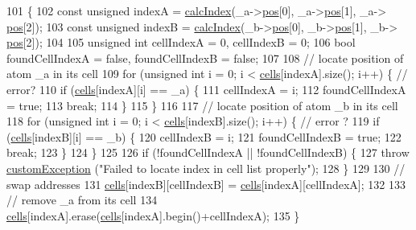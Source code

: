 \begin{DoxyCode}
101                                                         \{
102     \textcolor{keyword}{const} \textcolor{keywordtype}{unsigned} indexA = \hyperlink{classcell_list_aa6b843131cd487164a137571c7343cab}{calcIndex}(\_a->\hyperlink{classatom_a3ae5f4880e7831d8b2c9fda72b4eb24a}{pos}[0], \_a->\hyperlink{classatom_a3ae5f4880e7831d8b2c9fda72b4eb24a}{pos}[1], \_a->
      \hyperlink{classatom_a3ae5f4880e7831d8b2c9fda72b4eb24a}{pos}[2]);
103     \textcolor{keyword}{const} \textcolor{keywordtype}{unsigned} indexB = \hyperlink{classcell_list_aa6b843131cd487164a137571c7343cab}{calcIndex}(\_b->\hyperlink{classatom_a3ae5f4880e7831d8b2c9fda72b4eb24a}{pos}[0], \_b->\hyperlink{classatom_a3ae5f4880e7831d8b2c9fda72b4eb24a}{pos}[1], \_b->
      \hyperlink{classatom_a3ae5f4880e7831d8b2c9fda72b4eb24a}{pos}[2]);
104 
105     \textcolor{keywordtype}{unsigned} \textcolor{keywordtype}{int} cellIndexA = 0, cellIndexB = 0;
106     \textcolor{keywordtype}{bool} foundCellIndexA = \textcolor{keyword}{false}, foundCellIndexB = \textcolor{keyword}{false};
107 
108     \textcolor{comment}{// locate position of atom \_a in its cell}
109     \textcolor{keywordflow}{for} (\textcolor{keywordtype}{unsigned} \textcolor{keywordtype}{int} i = 0; i < \hyperlink{classcell_list_a10bc0c3ae819293b1e88bc7d1bfdb2aa}{cells}[indexA].size(); i++) \{ \textcolor{comment}{// error?}
110         \textcolor{keywordflow}{if} (\hyperlink{classcell_list_a10bc0c3ae819293b1e88bc7d1bfdb2aa}{cells}[indexA][i] == \_a) \{
111             cellIndexA = i;
112             foundCellIndexA = \textcolor{keyword}{true};
113             \textcolor{keywordflow}{break};
114         \}
115     \}
116 
117     \textcolor{comment}{// locate position of atom \_b in its cell}
118     \textcolor{keywordflow}{for} (\textcolor{keywordtype}{unsigned} \textcolor{keywordtype}{int} i = 0; i < \hyperlink{classcell_list_a10bc0c3ae819293b1e88bc7d1bfdb2aa}{cells}[indexB].size(); i++) \{ \textcolor{comment}{// error ?}
119         \textcolor{keywordflow}{if} (\hyperlink{classcell_list_a10bc0c3ae819293b1e88bc7d1bfdb2aa}{cells}[indexB][i] == \_b) \{
120             cellIndexB = i;
121             foundCellIndexB = \textcolor{keyword}{true};
122             \textcolor{keywordflow}{break};
123         \}
124     \}
125 
126     \textcolor{keywordflow}{if} (!foundCellIndexA || !foundCellIndexB) \{
127         \textcolor{keywordflow}{throw} \hyperlink{classcustom_exception}{customException} (\textcolor{stringliteral}{"Failed to locate index in cell list properly"});
128     \}
129 
130     \textcolor{comment}{// swap addresses}
131     \hyperlink{classcell_list_a10bc0c3ae819293b1e88bc7d1bfdb2aa}{cells}[indexB][cellIndexB] = \hyperlink{classcell_list_a10bc0c3ae819293b1e88bc7d1bfdb2aa}{cells}[indexA][cellIndexA];
132 
133     \textcolor{comment}{// remove \_a from its cell}
134     \hyperlink{classcell_list_a10bc0c3ae819293b1e88bc7d1bfdb2aa}{cells}[indexA].erase(\hyperlink{classcell_list_a10bc0c3ae819293b1e88bc7d1bfdb2aa}{cells}[indexA].begin()+cellIndexA);
135 \}
\end{DoxyCode}
